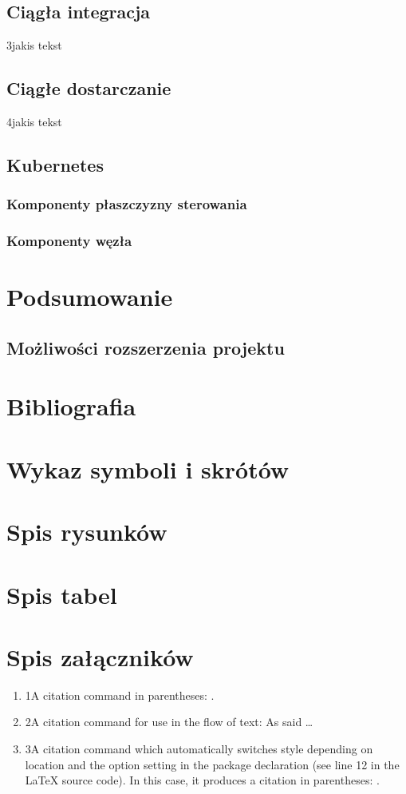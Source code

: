 \documentclass[11pt]{article} %
\begin{document}
\subsection{Ciągła integracja}
3jakis tekst
\subsection{Ciągłe dostarczanie}
4jakis tekst
\subsection{Kubernetes}
\subsubsection{Komponenty płaszczyzny sterowania}
\subsubsection{Komponenty węzła}
\section{Podsumowanie}
\subsection{Możliwości rozszerzenia projektu}
\section{Bibliografia}
\printbibliography
\section{Wykaz symboli i skrótów}
\section{Spis rysunków}
\section{Spis tabel}
\section{Spis załączników}

\begin{enumerate}
    \item 1A citation command in parentheses: \parencite{Smith:2012qr}.
    \item 2A citation command for use in the flow of text: As \textcite{Smith:2013jd} said \dots
    \item 3A citation command which automatically switches style depending on location and the option setting in the package declaration (see line 12 in the LaTeX source code). In this case, it produces a citation in parentheses: \autocite{Other:2014ab}.
    \end{enumerate}
\end{document}
